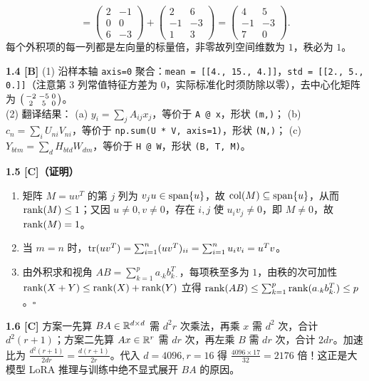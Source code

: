 \begin{enumerate}[label=(\arabic*)]
\[       = \begin{pmatrix}2&-1\\0&0\\6&-3\end{pmatrix}
       + \begin{pmatrix}2&6\\-1&-3\\1&3\end{pmatrix}
       = \begin{pmatrix}4&5\\-1&-3\\7&0\end{pmatrix}.
  \]
  每个外积项的每一列都是左向量的标量倍，非零故列空间维数为 $1$，秩必为 $1$。
\end{enumerate}

\textbf{1.4 [B]}
(1) 沿样本轴 \texttt{axis=0} 聚合：\texttt{mean = [[4., 15., 4.]]}，\texttt{std = [[2., 5., 0.]]}（注意第 3 列常值特征方差为 $0$，实际标准化时须防除以零），去中心化矩阵为 $\begin{psmallmatrix}-2 & -5 & 0\\ 2 & 5 & 0\end{psmallmatrix}$。\\
(2) 翻译结果：
(a) $y_i = \sum_j A_{ij} x_j$，等价于 \texttt{A @ x}，形状 \texttt{(m,)}；
(b) $c_n = \sum_i U_{ni} V_{ni}$，等价于 \texttt{np.sum(U * V, axis=1)}，形状 \texttt{(N,)}；
(c) $Y_{btm} = \sum_d H_{btd} W_{dm}$，等价于 \texttt{H @ W}，形状 \texttt{(B, T, M)}。

\textbf{1.5 [C]（证明）}
\begin{enumerate}[label=(\arabic*)]
  \item 矩阵 $M = uv^T$ 的第 $j$ 列为 $v_j u \in \operatorname{span}\{u\}$，故 $\operatorname{col}(M) \subseteq \operatorname{span}\{u\}$，从而 $\operatorname{rank}(M) \le 1$；又因 $u\neq 0, v\neq 0$，存在 $i,j$ 使 $u_i v_j \neq 0$，即 $M \neq 0$，故 $\operatorname{rank}(M) = 1$。
  \item 当 $m=n$ 时，$\operatorname{tr}(uv^T) = \sum_{i=1}^n (uv^T)_{ii} = \sum_{i=1}^n u_i v_i = u^T v$。
  \item 由外积求和视角 $AB = \sum_{k=1}^p a_{\cdot k} b_{k\cdot}^T$，每项秩至多为 $1$，由秩的次可加性 $\operatorname{rank}(X+Y)\le \operatorname{rank}(X)+\operatorname{rank}(Y)$ 立得 $\operatorname{rank}(AB) \le \sum_{k=1}^p \operatorname{rank}(a_{\cdot k} b_{k\cdot}^T) \le p$。$\square$
\end{enumerate}

\textbf{1.6 [C]}
方案一先算 $BA \in \mathbb{R}^{d\times d}$ 需 $d^2 r$ 次乘法，再乘 $x$ 需 $d^2$ 次，合计 $d^2(r+1)$；方案二先算 $Ax \in \mathbb{R}^r$ 需 $dr$ 次，再左乘 $B$ 需 $dr$ 次，合计 $2dr$。加速比为 $\frac{d^2(r+1)}{2dr} = \frac{d(r+1)}{2r}$。代入 $d=4096, r=16$ 得 $\frac{4096\times 17}{32} = 2176$ 倍！这正是大模型 LoRA 推理与训练中绝不显式展开 $BA$ 的原因。

